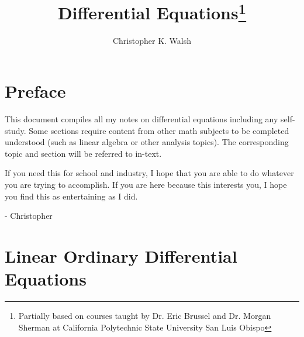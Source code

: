 \documentclass[12pt,openany]{book}
\title{Differential Equations\thanks{Partially based on courses taught by Dr. Eric Brussel and Dr. Morgan Sherman at California Polytechnic State University San Luis Obispo}}
\author{Christopher K. Walsh}
\date{ }
\theoremstyle{mydefinitionstyle}
\theoremstyle{myexamplestyle}
\theoremstyle{remark}
\begin{document}
\maketitle
\tableofcontents

\newpage
\chapter*{Preface}
This document compiles all my notes on differential equations including any self-study.
Some sections require content from other math subjects to be completed understood (such as linear algebra or other analysis topics).
The corresponding topic and section will be referred to in-text.

If you need this for school and industry, I hope that you are able to do whatever you are trying to accomplish.
If you are here because this interests you, I hope you find this as entertaining as I did.

- Christopher

\chapter{Linear Ordinary Differential Equations}

\end{document}
